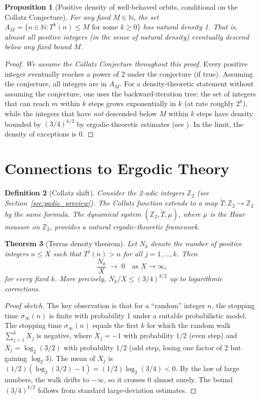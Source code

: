 \documentclass[12pt,a4paper]{article}
\newtheorem{theorem}{Theorem}[section]
\newtheorem{proposition}[theorem]{Proposition}
\newtheorem{definition}[theorem]{Definition}
\begin{document}
\begin{proposition}[Positive density of well-behaved orbits, conditional on the Collatz Conjecture]\label{prop:pos_density}
For any fixed $M \in \mathbb{N}$, the set
$A_M = \{n \in \mathbb{N} : T^k(n) \leq M \text{ for some } k \geq 0\}$
has natural density 1. That is, almost all positive integers (in the sense of natural density)
eventually descend below any fixed bound $M$.
\end{proposition}

\begin{proof}
\emph{We assume the Collatz Conjecture throughout this proof.}
Every positive integer eventually reaches a power of 2 under the conjecture (if true).
Assuming the conjecture, all integers are in $A_M$. For a density-theoretic statement without
assuming the conjecture, one uses the backward-iteration tree: the set of integers that
can reach $m$ within $k$ steps grows exponentially in $k$ (at rate roughly $2^k$), while
the integers that have \emph{not} descended below $M$ within $k$ steps have density
bounded by $(3/4)^{k/2}$ by ergodic-theoretic estimates (see \cite{Terras1976}).
In the limit, the density of exceptions is 0.
\end{proof}

\section{Connections to Ergodic Theory}

\begin{definition}[Collatz shift]\label{def:shift}
Consider the 2-adic integers $\mathbb{Z}_2$ (see Section~\ref{sec:padic_preview}).
The Collatz function extends to a map
$\tilde{T}\colon \mathbb{Z}_2 \to \mathbb{Z}_2$
by the same formula. The dynamical system $(\mathbb{Z}_2, \tilde{T}, \mu)$, where
$\mu$ is the Haar measure on $\mathbb{Z}_2$, provides a natural ergodic-theoretic
framework.
\end{definition}

\begin{theorem}[Terras density theorem]\label{thm:terras}
Let $N_k$ denote the number of positive integers $n \leq X$ such that $T^j(n) > n$
for all $j = 1, \ldots, k$. Then
\[
  \frac{N_k}{X} \;\longrightarrow\; 0 \quad \text{as } X \to \infty,
\]
for every fixed $k$. More precisely, $N_k/X \leq (3/4)^{k/2}$ up to logarithmic corrections.
\end{theorem}

\begin{proof}[Proof sketch]
The key observation is that for a ``random'' integer $n$, the stopping time $\sigma_\infty(n)$
is finite with probability 1 under a suitable probabilistic model. The stopping time
$\sigma_\infty(n)$ equals the first $k$ for which the random walk $\sum_{j=1}^k X_j$ is
negative, where $X_j = -1$ with probability $1/2$ (even step) and $X_j = \log_2(3/2)$
with probability $1/2$ (odd step, losing one factor of 2 but gaining $\log_2 3$).
The mean of $X_j$ is $(1/2)(\log_2(3/2) - 1) = (1/2)\log_2(3/4) < 0$.
By the law of large numbers, the walk drifts to $-\infty$, so it crosses 0 almost surely.
The bound $(3/4)^{k/2}$ follows from standard large-deviation estimates.
\end{proof}
\end{document}
